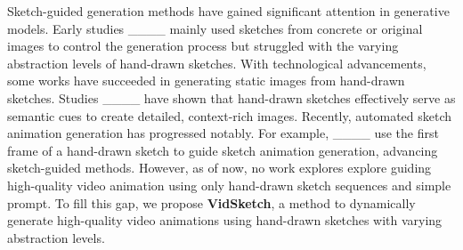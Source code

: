 Sketch-guided generation methods have gained significant attention in generative models. Early studies ____ mainly used sketches from concrete or original images to control the generation process but struggled with the varying abstraction levels of hand-drawn sketches. With technological advancements, some works have succeeded in generating static images from hand-drawn sketches. Studies ____ have shown that hand-drawn sketches effectively serve as semantic cues to create detailed, context-rich images. Recently, automated sketch animation generation has progressed notably. For example, ____ use the first frame of a hand-drawn sketch to guide sketch animation generation, advancing sketch-guided methods. However, as of now, no work explores explore guiding high-quality video animation using only hand-drawn sketch sequences and simple prompt. To fill this gap, we propose \textbf{VidSketch}, a method to dynamically generate high-quality video animations using hand-drawn sketches with varying abstraction levels.